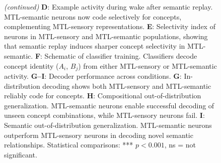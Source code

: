 \documentclass{article}
\begin{document}
\begin{figure}[t]
  \ContinuedFloat
  \captionsetup{list=off} %
  \caption{\textit{(continued)} \textbf{D}: Example activity during wake after semantic replay. MTL-semantic neurons now code selectively for concepts, complementing MTL-sensory representations.  
\textbf{E}: Selectivity index of neurons in MTL-sensory and MTL-semantic populations, showing that semantic replay induces sharper concept selectivity in MTL-semantic.  
\textbf{F}: Schematic of classifier training. Classifiers decode concept identity ($A_i$, $B_j$) from either MTL-sensory or MTL-semantic activity.  
\textbf{G--I}: Decoder performance across conditions. \textbf{G}: In-distribution decoding shows both MTL-sensory and MTL-semantic reliably code for concepts. \textbf{H}: Compositional out-of-distribution generalization. MTL-semantic neurons enable successful decoding of unseen concept combinations, while MTL-sensory neurons fail. \textbf{I}: Semantic out-of-distribution generalization. MTL-semantic neurons outperform MTL-sensory neurons in decoding novel semantic relationships. Statistical comparisons: *** $p < 0.001$, ns = not significant.}
\end{figure}
\end{document}
